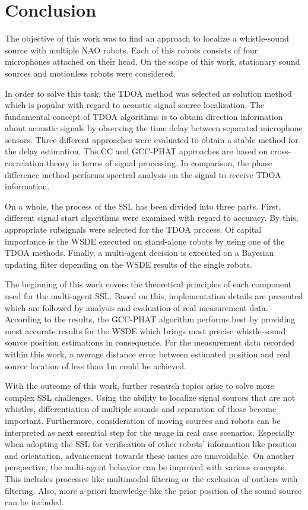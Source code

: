 \chapter{Conclusion}
\label{chap:05_conclusion}

The objective of this work was to find an approach to localize a whistle-sound
source with multiple NAO robots.
Each of this robots consists of four microphones attached on their head.
On the scope of this work, stationary sound sources and motionless robots were
considered.

In order to solve this task, the \acf{TDOA} method was selected as solution method
which is popular with regard to acoustic signal source localization. 
The fundamental concept of \ac{TDOA} algorithms is to obtain direction information
about acoustic signals by observing the time delay between separated microphone sensors.
Three different approaches were evaluated to obtain a stable method
for the delay estimation.
The \acf{CC} and \acf{GCC-PHAT} approaches are based on cross-correlation theory in terms
of signal processing.
In comparison, the phase difference method performs spectral analysis on the signal
to receive \ac{TDOA} information.

On a whole, the process of the \acf{SSL} has been divided into three parts.
First, different signal start algorithms were examined with regard to accuracy.
By this, appropriate subsignals were selected for the \ac{TDOA} process.
Of capital importance is the \acf{WSDE} executed on stand-alone robots by
using one of the \ac{TDOA} methods.
Finally, a multi-agent decision is executed on a Bayesian updating filter
depending on the \ac{WSDE} results of the single robots.

The beginning of this work covers the theoretical principles of each component
used for the multi-agent \ac{SSL}.
Based on this, implementation details are presented which are followed by analysis
and evaluation of real measurement data.
According to the results, the \acf{GCC-PHAT} algorithm performs best by
providing most accurate results for the \ac{WSDE} which brings most precise
whistle-sound source position estimations in consequence.
For the measurement data recorded within this work, a average
distance error between estimated position and real source location
of less than 1\si{\meter} could be achieved.

With the outcome of this work, further research topics arise to solve
more complex \ac{SSL} challenges.
Using the ability to localize signal sources that are not whistles,
differentiation of multiple sounds and separation of those become important.
Furthermore, consideration of moving sources and robots can be interpreted
as next essential step for the usage in real case scenarios.
Especially when adopting the \ac{SSL} for verification of other robots' information
like position and orientation, advancement towards these issues are unavoidable.
On another perspective, the multi-agent behavior can be improved with various
concepts.
This includes processes like multimodal filtering or the exclusion of outliers
with filtering.
Also, more a-priori knowledge like the prior position of the sound source can be included.

